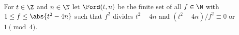 For $t\in\Z$ and $n\in\N$ let $\Ford(t,n)$ be the finite set of all $f\in\N$ with $1\le f\le\abs{t^2-4n}$ such that $f^2$ divides $t^2-4n$ and
$(t^2-4n)/f^2\equiv0$ or $1\pmod 4$.
